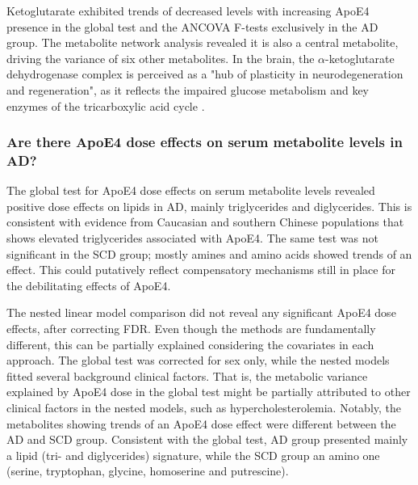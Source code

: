 \documentclass{amsart}
\begin{document}
Ketoglutarate exhibited trends of decreased levels with increasing ApoE4 presence in the global test and the ANCOVA F-tests exclusively in the AD group. The metabolite network analysis revealed it is also a central metabolite, driving the variance of six other metabolites. In the brain, the $\alpha$-ketoglutarate dehydrogenase complex is perceived as a "hub of plasticity in neurodegeneration and regeneration", as it reflects the impaired glucose metabolism and key enzymes of the tricarboxylic acid cycle \cite*{Hansen2022TheD}.

\subsubsection{Are there ApoE4 dose effects on serum metabolite levels in AD?}
The global test for ApoE4 dose effects on serum metabolite levels revealed positive dose effects on lipids in AD, mainly triglycerides and diglycerides. This is consistent with evidence from Caucasian \cite{Maxwell2013APOEMT,CARVALHOWELLS20121447,Bernath2020SerumTI} and southern Chinese populations \cite{Gan2022EffectsPopulation} that shows elevated triglycerides associated with ApoE4. The same test was not significant in the SCD group; mostly amines and amino acids showed trends of an effect. This could putatively reflect compensatory mechanisms still in place for the debilitating effects of ApoE4.

The nested linear model comparison did not reveal any significant ApoE4 dose effects, after correcting FDR. Even though the methods are fundamentally different, this can be partially explained considering the covariates in each approach. The global test was corrected for sex only, while the nested models fitted several background clinical factors. That is, the metabolic variance explained by ApoE4 dose in the global test might be partially attributed to other clinical factors in the nested models, such as hypercholesterolemia. Notably, the metabolites showing trends of an ApoE4 dose effect were different between the AD and SCD group. Consistent with the global test, AD group presented mainly a lipid (tri- and diglycerides) signature, while the SCD group an amino one (serine, tryptophan, glycine, homoserine and putrescine).
\end{document}
